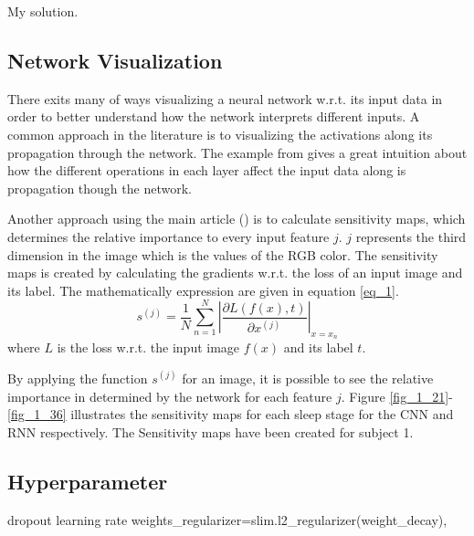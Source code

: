 My solution.



\subsection{Network Visualization}

There exits many of ways visualizing a neural network w.r.t. its input data in order to better understand how the network interprets different inputs.  A common approach in the literature is to visualizing the activations along its propagation through the network. The example from \cite{stand_cnn} gives a great intuition about how the different operations in each layer affect the input data along is propagation though the network. 

Another approach using the main article (\cite{main_ar}) is to calculate sensitivity maps, which determines the relative importance to every input feature $j$. $j$ represents the third dimension in the image which is the values of the RGB color.
The sensitivity maps is created by calculating the gradients w.r.t. the loss of an input image and its label. The mathematically expression are given in equation \ref{eq_1}.
\begin{equation}
s^{\left(j\right)} = \frac { 1 }{ N  } \sum _{ n=1 }^{ N } \left| \frac { \partial L\left( f\left( x \right) ,t \right)  }{ \partial x^{ \left( j \right)  } }  \right| _{x=x_n}
\label{eq_1}
\end{equation}
where $L$ is the loss w.r.t. the input image $f\left(x\right)$ and its label $t$. 

By applying the function $s^{\left(j\right)}$ for an image, it is possible to see the relative importance in determined by the network for each feature $j$. 
Figure \ref{fig_1_21}-\ref{fig_1_36} illustrates the sensitivity maps for each sleep stage for the CNN and RNN respectively. The Sensitivity maps have been created for subject 1.



\subsection{Hyperparameter}


dropout 
learning rate
weights\_regularizer=slim.l2\_regularizer(weight\_decay),


